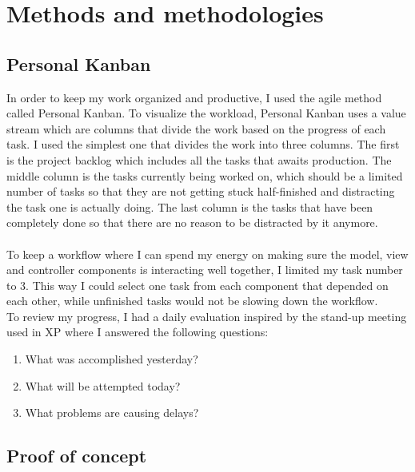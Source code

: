 
\chapter{Methods and methodologies} %

\label{Chapter3} %


\section{Personal Kanban}
In order to keep my work organized and productive, I used the agile method called Personal Kanban. To visualize the workload, Personal Kanban uses a value stream which are columns that divide the work based on the progress of each task. I used the simplest one that divides the work into three columns. The first is the project backlog which includes all the tasks that awaits production. The middle column is the tasks currently being worked on, which should be a limited number of tasks so that they are not getting stuck half-finished and distracting the task one is actually doing. The last column is the tasks that have been completely done so that there are no reason to be distracted by it anymore. \parencite{Reference1}
\\\\
To keep a workflow where I can spend my energy on making sure the model, view and controller components is interacting well together, I limited my task number to 3. This way I could select one task from each component that depended on each other, while unfinished tasks would not be slowing down the workflow.\\
To review my progress, I had a daily evaluation inspired by the stand-up meeting used in XP \parencite{Reference2} where I answered the following questions:
\begin{enumerate}
\item What was accomplished yesterday?
\item What will be attempted today?
\item What problems are causing delays?
\end{enumerate}



\section{Proof of concept}


